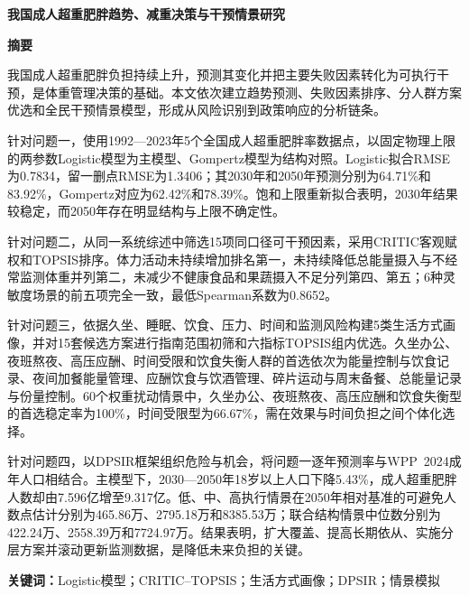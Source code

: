 \documentclass[a4paper,11pt]{article}
\begin{document}
\begin{center}
  {\LARGE\bfseries 我国成人超重肥胖趋势、减重决策与干预情景研究}
\end{center}
\vspace{1em}

\begin{center}
  {\Large\bfseries 摘\quad 要}
\end{center}
\vspace{0.4em}

\noindent 我国成人超重肥胖负担持续上升，预测其变化并把主要失败因素转化为可执行干预，是体重管理决策的基础。本文依次建立趋势预测、失败因素排序、分人群方案优选和全民干预情景模型，形成从风险识别到政策响应的分析链条。

针对问题一，使用1992---2023年5个全国成人超重肥胖率数据点，以固定物理上限的两参数Logistic模型为主模型、Gompertz模型为结构对照。Logistic拟合RMSE为0.7834，留一删点RMSE为1.3406；其2030年和2050年预测分别为64.71\%和83.92\%，Gompertz对应为62.42\%和78.39\%。饱和上限重新拟合表明，2030年结果较稳定，而2050年存在明显结构与上限不确定性。

针对问题二，从同一系统综述中筛选15项同口径可干预因素，采用CRITIC客观赋权和TOPSIS排序。体力活动未持续增加排名第一，未持续降低总能量摄入与不经常监测体重并列第二，未减少不健康食品和果蔬摄入不足分列第四、第五；6种灵敏度场景的前五项完全一致，最低Spearman系数为0.8652。

针对问题三，依据久坐、睡眠、饮食、压力、时间和监测风险构建5类生活方式画像，并对15套候选方案进行指南范围初筛和六指标TOPSIS组内优选。久坐办公、夜班熬夜、高压应酬、时间受限和饮食失衡人群的首选依次为能量控制与饮食记录、夜间加餐能量管理、应酬饮食与饮酒管理、碎片运动与周末备餐、总能量记录与份量控制。60个权重扰动情景中，久坐办公、夜班熬夜、高压应酬和饮食失衡型的首选稳定率为100\%，时间受限型为66.67\%，需在效果与时间负担之间个体化选择。

针对问题四，以DPSIR框架组织危险与机会，将问题一逐年预测率与WPP~2024成年人口相结合。主模型下，2030---2050年18岁以上人口下降5.43\%，成人超重肥胖人数却由7.596亿增至9.317亿。低、中、高执行情景在2050年相对基准的可避免人数点估计分别为465.86万、2795.18万和8385.53万；联合结构情景中位数分别为422.24万、2558.39万和7724.97万。结果表明，扩大覆盖、提高长期依从、实施分层方案并滚动更新监测数据，是降低未来负担的关键。
\vspace{0.5em}

\noindent\textbf{关键词：}Logistic模型；CRITIC--TOPSIS；生活方式画像；DPSIR；情景模拟

\newpage












\end{document}
